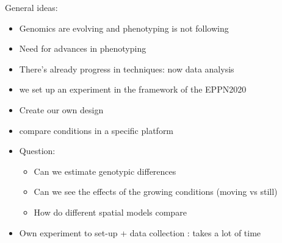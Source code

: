 General ideas:
\begin{itemize}
	\item Genomics are evolving and phenotyping is not following
	\item Need for advances in phenotyping
	\item There's already progress in techniques: now data analysis
	\item we set up an experiment in the framework of the EPPN2020 
	\item Create our own design
	\item compare conditions in a specific platform
	\item Question: 
	\begin{itemize}
		\item Can we estimate genotypic differences
		\item Can we see the effects of the growing conditions (moving vs still)
		\item How do different spatial models compare
	\end{itemize}
	\item Own experiment to set-up + data collection : takes a lot of time
\end{itemize}